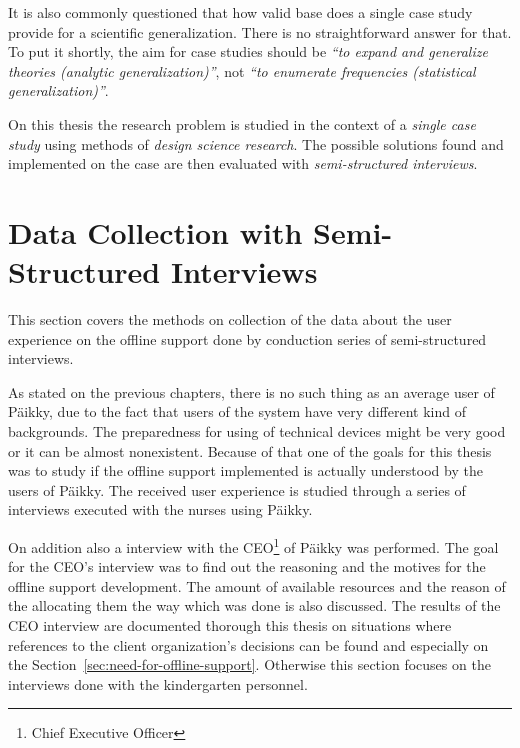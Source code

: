 It is also commonly questioned that how valid base does a single case study provide for a scientific generalization. There is no straightforward answer for that. To put it shortly, the aim for case studies should be \textit{``to expand and generalize theories (analytic generalization)''}, not \textit{``to enumerate frequencies (statistical generalization)''}. \cite[Page 15]{yin_case_2013}

On this thesis the research problem is studied in the context of a \textit{single case study} using methods of \textit{design science research}. The possible solutions found and implemented on the case are then evaluated with \textit{semi-structured interviews}.











\section{Data Collection with Semi-Structured Interviews}

This section covers the methods on collection of the data about the user experience on the offline support done by conduction series of semi-structured interviews.

As stated on the previous chapters, there is no such thing as an average user of Päikky, due to the fact that users of the system have very different kind of backgrounds. The preparedness for using of technical devices might be very good or it can be almost nonexistent. Because of that one of the goals for this thesis was to study if the offline support implemented is actually understood by the users of Päikky. The received user experience is studied through a series of interviews executed with the nurses using Päikky.

On addition also a interview with the CEO\footnote{Chief Executive Officer} of Päikky was performed. The goal for the CEO's interview was to find out the reasoning and the motives for the offline support development. The amount of available resources and the reason of the allocating them the way which was done is also discussed. The results of the CEO interview are documented thorough this thesis on situations where references to the client organization's decisions can be found and especially on the Section~\ref{sec:need-for-offline-support}. Otherwise this section focuses on the interviews done with the kindergarten personnel.

